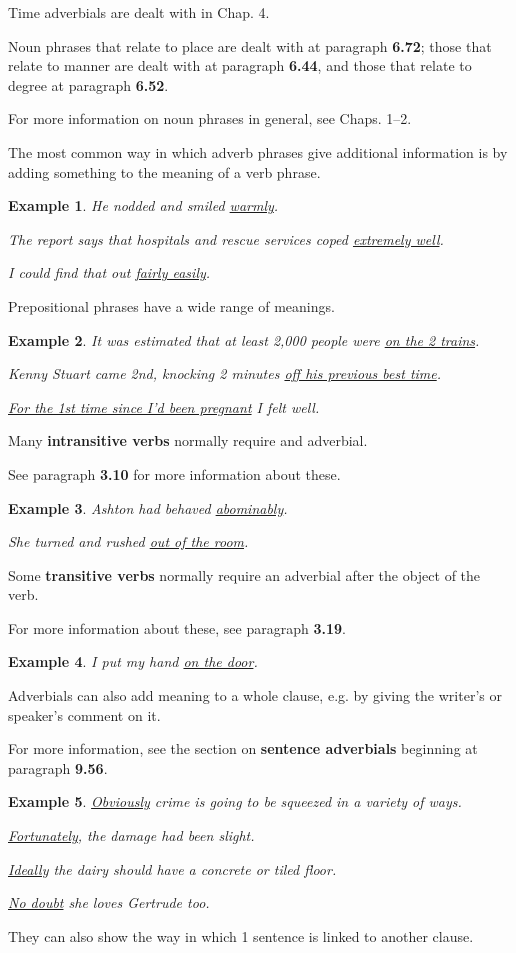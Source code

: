 \documentclass[oneside]{book}
\numberwithin{equation}{section}
\newtheorem{example}{Example}[section]
\begin{document}
Time adverbials are dealt with in Chap. 4.

Noun phrases that relate to place are dealt with at paragraph \textbf{6.72}; those that relate to manner are dealt with at paragraph \textbf{6.44}, and those that relate to degree at paragraph \textbf{6.52}.

%
For more information on noun phrases in general, see Chaps. 1--2.

%
\noindent{} The most common way in which adverb phrases give additional information is by adding something to the meaning of a verb phrase.
\begin{example}
    He nodded and smiled \underline{warmly}.
    
    The report says that hospitals and rescue services coped \underline{extremely well}.
    
    I could find that out \underline{fairly easily}.
\end{example}
Prepositional phrases have a wide range of meanings.
\begin{example}
    It was estimated that at least 2,000 people were \underline{on the 2 trains}.
    
    Kenny Stuart came 2nd, knocking 2 minutes \underline{off his previous best time}.
    
    \underline{For the 1st time since I'd been pregnant} I felt well.
\end{example}
Many \textbf{intransitive verbs} normally require and adverbial.

See paragraph \textbf{3.10} for more information about these.
\begin{example}
    Ashton had behaved \underline{abominably}.
    
    She turned and rushed \underline{out of the room}.
\end{example}
Some \textbf{transitive verbs} normally require an adverbial after the object of the verb.

For more information about these, see paragraph \textbf{3.19}.
\begin{example}
    I put my hand \underline{on the door}.
\end{example}
%
\noindent{} Adverbials can also add meaning to a whole clause, e.g. by giving the writer's or speaker's comment on it.

For more information, see the section on \textbf{sentence adverbials} beginning at paragraph \textbf{9.56}.
\begin{example}
    \underline{Obviously} crime is going to be squeezed in a variety of ways.
    
    \underline{Fortunately}, the damage had been slight.
    
    \underline{Ideally} the dairy should have a concrete or tiled floor.
    
    \underline{No doubt} she loves Gertrude too.
\end{example}
They can also show the way in which 1 sentence is linked to another clause.
\end{document}
